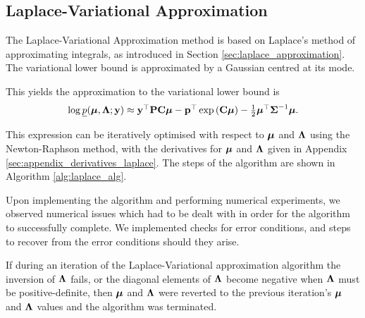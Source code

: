 \subsection{Laplace-Variational Approximation}

The Laplace-Variational Approximation method is based on Laplace's method of
approximating integrals, as introduced in Section
\ref{sec:laplace_approximation}. The variational lower bound  is approximated
by a Gaussian centred at its mode.

This yields the approximation to the variational lower bound is
\begin{equation}
\label{eq:laplace_variational_lower_bound}
\begin{array}{ll}
	\log \underline{p}({\boldsymbol \mu}, {\boldsymbol \Lambda}; {\bf y}) \approx {\bf y}^\top{\bf P}{\bf C}{\boldsymbol\mu} - {\bf p}^\top\exp \left ({\bf C} {\boldsymbol \mu} \right ) - \tfrac{1}{2} {\boldsymbol \mu}^\top {\boldsymbol\Sigma}^{-1} {\boldsymbol \mu}. 
\end{array}
\end{equation}
		
\noindent This expression can be iteratively optimised with respect to ${\boldsymbol \mu}$
and ${\boldsymbol \Lambda}$ using the Newton-Raphson method, with the derivatives for ${\boldsymbol \mu}$
and ${\boldsymbol \Lambda}$ given in Appendix \ref{sec:appendix_derivatives_laplace}. The
steps of the algorithm are shown in Algorithm \ref{alg:laplace_alg}.
		
Upon implementing the algorithm and performing numerical experiments, we
observed numerical issues which had to be dealt with in order for the algorithm
to successfully complete.
We implemented checks for error conditions, and steps to recover from the error
conditions should they arise.

If during an iteration of the Laplace-Variational approximation algorithm the
inversion  of ${\boldsymbol \Lambda}$ fails, or the diagonal elements of ${\boldsymbol \Lambda}$ become
negative when ${\boldsymbol \Lambda}$ must be positive-definite, then ${\boldsymbol \mu}$ and ${\boldsymbol \Lambda}$
were reverted to the previous iteration's ${\boldsymbol \mu}$ and ${\boldsymbol \Lambda}$ values and the
algorithm was terminated.

